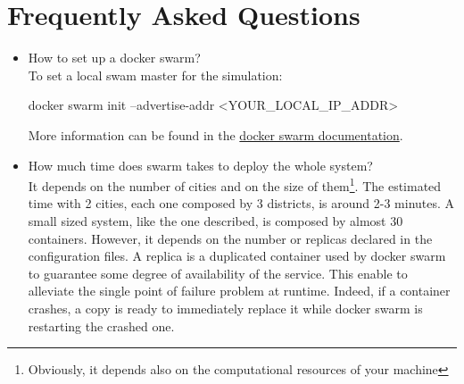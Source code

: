 \section{Frequently Asked Questions}

\begin{itemize}

\item How to set up a docker swarm?
\\

To set a local swam master for the simulation:

docker swarm init --advertise-addr <YOUR\_LOCAL\_IP\_ADDR>

More information can be found in the \href{https://docs.docker.com/engine/swarm/swarm-tutorial/create-swarm/}{docker swarm documentation}.

\item How much time does swarm takes to deploy the whole system?
\\

It depends on the number of cities and on the size of them\footnote{Obviously,
it depends also on the computational resources of your machine}.
The estimated time with 2 cities, each one
composed by 3 districts, is around 2-3 minutes.
A small sized system, like
the one described, is composed by almost 30 containers.
However, it depends on the number or replicas declared in the configuration files.
A replica is a duplicated container used by docker swarm to guarantee some
degree of availability of the service. This enable to alleviate the single
point of failure problem at runtime. Indeed, if a container crashes, a copy
is ready to immediately replace it while docker swarm is restarting the crashed
one.

\end{itemize}
